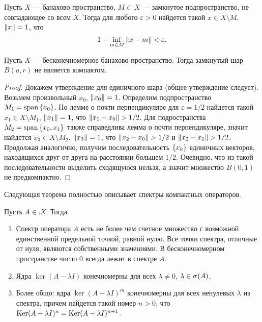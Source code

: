 \begin{lemma}
    Пусть $X$ --- банахово пространство, $M \subset X$ --- замкнутое подпространство,
    не совпадающее со всем $X$. Тогда
    для любого $\varepsilon > 0$ найдется такой $x \in X \setminus M$, $\left\|x\right\| = 1$, что
    \[ 1 - \inf_{m\in M} \left\|x - m\right\| < \varepsilon. \]
\end{lemma}

\begin{theorem}[Рисса]
    Пусть $X$ --- бесконечномерное банахово пространство. Тогда замкнутый шар 
    $\overline{B(a, r)}$ не является компактом.
\end{theorem}

\begin{proof}
    Докажем утверждение для единичного шара (общее утверждение следует). Возьмем произвольный
    $x_0$, $\left\|x_0\right\| = 1$. Определим подпространство $M_1 = \operatorname{span}\left\{x_0\right\}$. 
    По лемме о почти перпендикуляре для $\varepsilon = 1/2$ найдется такой 
    $x_1 \in X \setminus M_1$, $\left\|x_1\right\| = 1$, что
    $\left\|x_1 - x_0\right\| > 1/2$. Для подространства $M_2 = \operatorname{span}\left\{x_0, x_1\right\}$ также 
    справедлива лемма о почти перпендикуляре, значит найдется $x_3 \in X \setminus M_2$, 
    $\left\|x_3\right\| = 1$, что $\left\|x_2 - x_0\right\| > 1/2$ и $\left\|x_2 - x_1\right\| > 1/2$. Продолжая аналогично, получим
    последовательность $\left\{x_k\right\}$ единичных векторов, находящихся друг от друга на расстоянии 
    большем $1/2$.
    Очевидно, что из такой последовательности выделить сходящуюся нельзя, а значит множество 
    $\overline{B(0, 1)}$ не предкомпактно.
\end{proof}

Следующая теорема полностью описывает спектры компактных операторов.

\begin{theorem}
    Пусть $A \in \comp{X}$. Тогда
    \begin{enumerate}
        \item Спектр оператора $A$ есть не более чем счетное множество с возможной единственной
        предельной точкой, равной нулю. Все точки спектра, отличные от нуля, являются собственными
        значениями. В бесконечномерном пространстве число $0$ всегда лежит в спектре $A$.
        \item Ядра $\ker(A- \lambda I)$ конечномерны для всех $\lambda \neq 0$, 
        $\lambda \in \spectrum{A}$.
        \item Более общо: ядра $\ker (A - \lambda I)^m$ конечномерны для всех ненулевых $\lambda$
        из спектра, причем найдется такой номер $n > 0$, что 
        $\ker (A - \lambda I)^n \hm= \ker (A - \lambda I)^{n+1}$.
    \end{enumerate}
\end{theorem}

